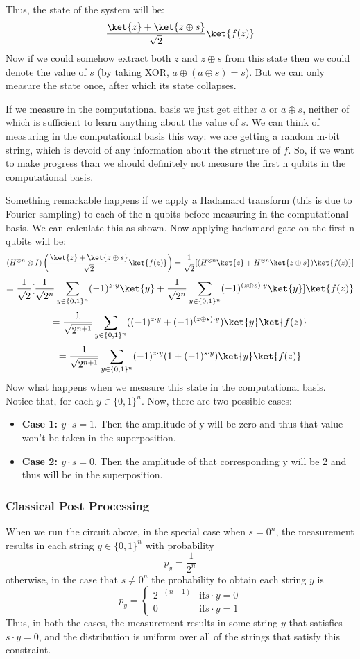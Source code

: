 \documentclass[12pt, oneside]{book}
\theoremstyle{definition}
\theoremstyle{definition}
\theoremstyle{remark}
\begin{document}
Thus, the state of the system will be:
\[
    \frac{\ket{z}+\ket{z\oplus s}}{\sqrt{2}}\ket{f(z)}
\]
Now if we could somehow extract both $z$ and $z \oplus s$ from this state then we could denote the value of $s$ (by taking XOR, $a \oplus (a\oplus s)=s$). But we can only measure the state once, after which its state collapses.

If we measure in the computational basis we just get either $a$ or $a \oplus s$, neither of which is sufficient to learn anything about the value of $s$. We can think of measuring in the computational basis this way: we are getting a random m-bit string, which is devoid of any information about the structure of $f$. So, if we want to make progress than we should definitely not measure the first n qubits in the computational basis.

Something remarkable happens if we apply a Hadamard transform (this is due to Fourier sampling) to each of the n qubits before measuring in the computational basis. We can calculate this as shown.
Now applying hadamard gate on the first n qubits will be:
\[
    (H^{\otimes n}\otimes I)\left(\frac{\ket{z}+\ket{z\oplus s}}{\sqrt{2}}\ket{f(z)}\right)=\frac{1}{\sqrt{2}}[(H^{\otimes n}\ket{z}+H^{\otimes n}\ket{z\oplus s})\ket{f(z)}]
\]
\[
    =\frac{1}{\sqrt{2}}[\frac{1}{\sqrt{2^n}}\sum_{y \in \{0,1\}^n}(-1)^{z\cdot y}\ket{y}+\frac{1}{\sqrt{2^n}}\sum_{y \in \{0,1\}^n}(-1)^{(z\oplus s)\cdot y}\ket{y}]\ket{f(z)}
\]
\[
    =\frac{1}{\sqrt{2^{n+1}}}\sum_{y \in \{0,1\}^n}((-1)^{z\cdot y}+(-1)^{(z\oplus s) \cdot y})\ket{y}\ket{f(z)}
\]
\[
    =\frac{1}{\sqrt{2^{n+1}}}\sum_{y \in \{0,1\}^n}(-1)^{z\cdot y}(1+(-1)^{s\cdot y})\ket{y}\ket{f(z)}
\]
Now what happens when we measure this state in the computational basis. Notice that, for each $y\in\{0,1\}^n$. Now, there are two possible cases:
\begin{itemize}
    \item \textbf{Case 1: $y\cdot s=1$}. Then the amplitude of y will be zero and thus that value won't be taken in the superposition.
    \item \textbf{Case 2: $y\cdot s=0$}. Then the amplitude of that corresponding y will be 2 and thus will be in the superposition.
\end{itemize}

\subsubsection{Classical Post Processing}
When we run the circuit above, in the special case when $s=0^n$, the measurement results in each string $y\in\{0,1\}^n$ with probability
\[
p_y=\frac{1}{2^n}
\]
otherwise, in the case that $s\neq 0^n$ the probability to obtain each string $y$ is
\[
p_y=\begin{cases} 2^{-(n-1)} & \text{if} s\cdot y=0 \\ 0 & \text{if} s\cdot y=1 \end{cases}
\]
Thus, in both the cases, the measurement results in some string $y$ that satisfies $s\cdot y=0$, and the distribution is uniform over all of the strings that satisfy this constraint.
\end{document}
